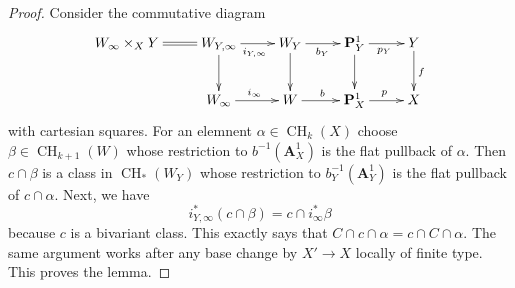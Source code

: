 \documentclass[10pt,a4paper]{amsart}
\theoremstyle{plain}
\theoremstyle{definition}
\theoremstyle{remark}
\numberwithin{equation}{subsection}
\def\CH{\mathop{\mathrm{CH}}\nolimits}
\begin{document}
\begin{proof}
Consider the commutative diagram
$$
\xymatrix{
W_\infty \times_X Y \ar@{=}[r] &
W_{Y, \infty} \ar[r]_{i_{Y, \infty}} \ar[d] &
W_Y \ar[r]_{b_Y} \ar[d] &
\mathbf{P}^1_Y \ar[r]_{p_Y} \ar[d] &
Y \ar[d]^f \\
& W_\infty \ar[r]^{i_\infty} &
W \ar[r]^b &
\mathbf{P}^1_X \ar[r]^p &
X
}
$$
with cartesian squares. For an elemnent $\alpha \in \CH_k(X)$
choose $\beta \in \CH_{k + 1}(W)$ whose restriction to $b^{-1}(\mathbf{A}^1_X)$
is the flat pullback of $\alpha$. Then $c \cap \beta$ is a class
in $\CH_*(W_Y)$ whose restriction to $b_Y^{-1}(\mathbf{A}^1_Y)$
is the flat pullback of $c \cap \alpha$. Next, we have
$$
i_{Y, \infty}^*(c \cap \beta) = c \cap i_\infty^*\beta
$$
because $c$ is a bivariant class. This exactly says that
$C \cap c \cap \alpha = c \cap C \cap \alpha$. The same argument
works after any base change by $X' \to X$ locally of finite type.
This proves the lemma.
\end{proof}
\end{document}

